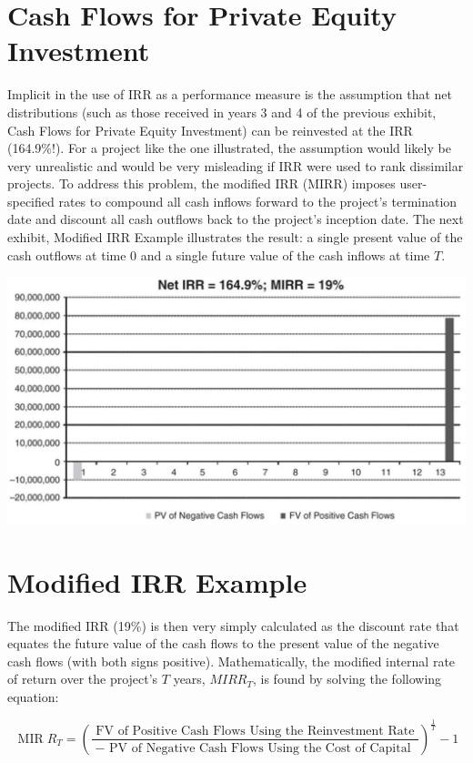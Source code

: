 \documentclass[11pt]{article}
\begin{document}
\section*{Cash Flows for Private Equity Investment}
Implicit in the use of IRR as a performance measure is the assumption that net distributions (such as those received in years 3 and 4 of the previous exhibit, Cash Flows for Private Equity Investment) can be reinvested at the IRR (164.9\%!). For a project like the one illustrated, the assumption would likely be very unrealistic and would be very misleading if IRR were used to rank dissimilar projects. To address this problem, the modified IRR (MIRR) imposes user-specified rates to compound all cash inflows forward to the project's termination date and discount all cash outflows back to the project's inception date. The next exhibit, Modified IRR Example illustrates the result: a single present value of the cash outflows at time 0 and a single future value of the cash inflows at time $T$.

\begin{center}
\includegraphics[max width=\textwidth]{2024_04_10_6f0546190ca30f08bc91g-5}
\end{center}

\section*{Modified IRR Example}
The modified IRR (19\%) is then very simply calculated as the discount rate that equates the future value of the cash flows to the present value of the negative cash flows (with both signs positive). Mathematically, the modified internal rate of return over the project's $T$ years, $M I R R_{T}$, is found by solving the following equation:


\begin{equation*}
\operatorname{MIR} R_{T}=\left(\frac{\text { FV of Positive Cash Flows Using the Reinvestment Rate }}{- \text { PV of Negative Cash Flows Using the Cost of Capital }}\right)^{\frac{1}{T}}-1 \tag{1}
\end{equation*}
\end{document}
